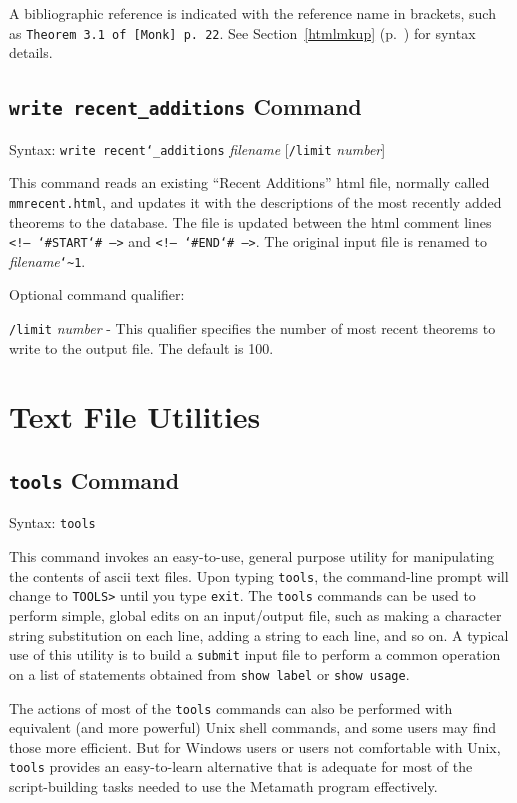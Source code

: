 A bibliographic reference is indicated with the reference name
in brackets, such as  \texttt{Theorem 3.1 of
[Monk] p.\ 22}.
See Section~\ref{htmlmkup} (p.~\pageref{htmlmkup}) for
syntax details.


\subsection{\texttt{write recent\_additions}
Command}
Syntax:  \texttt{write recent{\char`\_}additions} {\em filename}
[\texttt{/limit} {\em number}]

This command reads an existing ``Recent Additions'' {\sc html} file,
normally called \texttt{mmrecent.html}, and updates it with the
descriptions of the most recently added theorems to the database.
 The file is updated between
the {\sc html} comment lines \texttt{<!-- {\char`\#}START{\char`\#} -->}
and \texttt{<!-- {\char`\#}END{\char`\#} -->}.  The original input file
is renamed to {\em filename}\texttt{{\char`\~}1}.

Optional command qualifier:

    \texttt{/limit} {\em number} -
 This qualifier specifies the number of most recent theorems to
   write to the output file.  The default is 100.


\section{Text File Utilities}

\subsection{\texttt{tools} Command}
Syntax:  \texttt{tools}

This command invokes an easy-to-use, general purpose utility for
manipulating the contents of {\sc ascii} text files.  Upon typing
\texttt{tools}, the command-line prompt will change to \texttt{TOOLS>}
until you type \texttt{exit}.  The \texttt{tools} commands can be used
to perform simple, global edits on an input/output file,
such as making a character string substitution on each line, adding a
string to each line, and so on.  A typical use of this utility is
to build a \texttt{submit} input file to perform a common operation on a
list of statements obtained from \texttt{show label} or \texttt{show
usage}.

The actions of most of the \texttt{tools} commands can also be
performed with equivalent (and more powerful) Unix shell commands, and
some users may find those more efficient.  But for Windows users or
users not comfortable with Unix, \texttt{tools} provides an
easy-to-learn alternative that is adequate for most of the
script-building tasks needed to use the Metamath program effectively.


